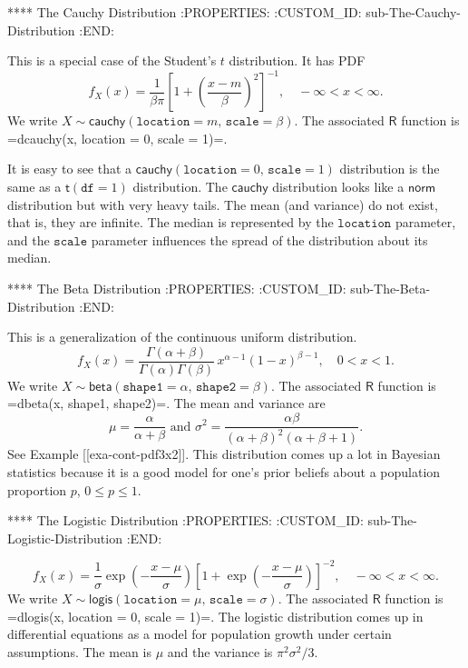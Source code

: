 **** The Cauchy Distribution
:PROPERTIES:
:CUSTOM_ID: sub-The-Cauchy-Distribution
:END:

This is a special case of the Student's \(t\) distribution. It has PDF
\begin{equation}
f_{X}(x) = \frac{1}{\beta\pi} \left[ 1+\left( \frac{x-m}{\beta} \right)^{2} \right]^{-1},\quad -\infty < x < \infty.
\end{equation}
We write \(X \sim \mathsf{cauchy}(\mathtt{location} =
m,\,\mathtt{scale} = \beta)\). The associated \(\mathsf{R}\) function
is =dcauchy(x, location = 0, scale = 1)=.

It is easy to see that a \(\mathsf{cauchy}(\mathtt{location} =
0,\,\mathtt{scale} = 1)\) distribution is the same as a
\(\mathsf{t}(\mathtt{df}=1)\) distribution. The \(\mathsf{cauchy}\)
distribution looks like a \(\mathsf{norm}\) distribution but with very
heavy tails. The mean (and variance) do not exist, that is, they are
infinite. The median is represented by the \(\mathtt{location}\)
parameter, and the \(\mathtt{scale}\) parameter influences the spread
of the distribution about its median.

**** The Beta Distribution
:PROPERTIES:
:CUSTOM_ID: sub-The-Beta-Distribution
:END:

This is a generalization of the continuous uniform distribution.
\begin{equation}
f_{X}(x)=\frac{\Gamma(\alpha+\beta)}{\Gamma(\alpha)\Gamma(\beta)}\, x^{\alpha-1}(1-x)^{\beta-1},\quad 0 < x < 1.
\end{equation}
We write
\(X\sim\mathsf{beta}(\mathtt{shape1}=\alpha,\,\mathtt{shape2}=\beta)\). The
associated \(\mathsf{R}\) function is =dbeta(x, shape1, shape2)=. The
mean and variance are
\begin{equation} 
\mu=\frac{\alpha}{\alpha+\beta}\mbox{ and }\sigma^{2}=\frac{\alpha\beta}{\left(\alpha+\beta\right)^{2}\left(\alpha+\beta+1\right)}.
\end{equation}
See Example [[exa-cont-pdf3x2]]. This distribution comes up a lot in Bayesian
statistics because it is a good model for one's prior beliefs about a
population proportion \(p\), \(0\leq p\leq1\).

**** The Logistic Distribution
:PROPERTIES:
:CUSTOM_ID: sub-The-Logistic-Distribution
:END:

\begin{equation}
f_{X}(x)=\frac{1}{\sigma}\exp\left(-\frac{x-\mu}{\sigma}\right)\left[1+\exp\left(-\frac{x-\mu}{\sigma}\right)\right]^{-2},\quad -\infty < x < \infty.
\end{equation}
We write
\(X\sim\mathsf{logis}(\mathtt{location}=\mu,\,\mathtt{scale}=\sigma)\). The
associated \(\mathsf{R}\) function is =dlogis(x, location = 0, scale =
1)=. The logistic distribution comes up in differential equations as a
model for population growth under certain assumptions. The mean is
\(\mu\) and the variance is \(\pi^{2}\sigma^{2}/3\).

